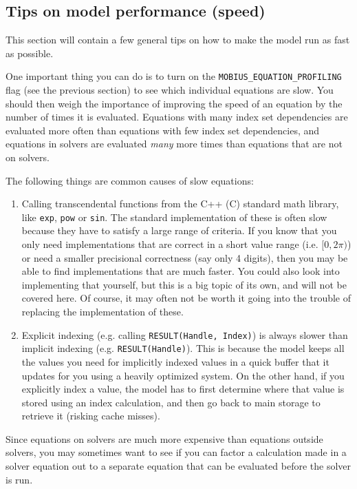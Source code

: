 \documentclass[11pt]{article}
\theoremstyle{definition}
\begin{document}
\subsection{Tips on model performance (speed)}\label{sec:performance}

This section will contain a few general tips on how to make the model run as fast as possible.

One important thing you can do is to turn on the {\tt MOBIUS\_EQUATION\_PROFILING} flag (see the previous section) to see which individual equations are slow. You should then weigh the importance of improving the speed of an equation by the number of times it is evaluated. Equations with many index set dependencies are evaluated more often than equations with few index set dependencies, and equations in solvers are evaluated \emph{many} more times than equations that are not on solvers.

The following things are common causes of slow equations:
\begin{enumerate}[i]
\item Calling transcendental functions from the C++ (C) standard math library, like {\tt exp}, {\tt pow} or {\tt sin}. The standard implementation of these is often slow because they have to satisfy a large range of criteria. If you know that you only need implementations that are correct in a short value range (i.e. $[0, 2\pi)$) or need a smaller precisional correctness (say only 4 digits), then you may be able to find implementations that are much faster. You could also look into implementing that yourself, but this is a big topic of its own, and will not be covered here. Of course, it may often not be worth it going into the trouble of replacing the implementation of these.
\item Explicit indexing (e.g. calling {\tt RESULT(Handle, Index)}) is always slower than implicit indexing (e.g. {\tt RESULT(Handle)}). This is because the model keeps all the values you need for implicitly indexed values in a quick buffer that it updates for you using a heavily optimized system. On the other hand, if you explicitly index a value, the model has to first determine where that value is stored using an index calculation, and then go back to main storage to retrieve it (risking cache misses).
\end{enumerate}

Since equations on solvers are much more expensive than equations outside solvers, you may sometimes want to see if you can factor a calculation made in a solver equation out to a separate equation that can be evaluated before the solver is run.
\end{document}
